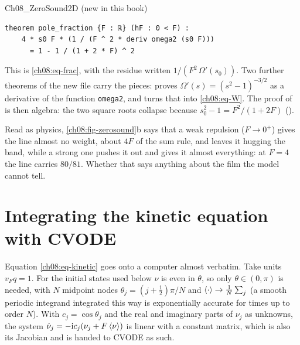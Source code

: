 \begin{leanbox}{Ch08\_ZeroSound2D (new in this book)}
\begin{lstlisting}[style=lean]
theorem pole_fraction {F : ℝ} (hF : 0 < F) :
    4 * s0 F * (1 / (F ^ 2 * deriv omega2 (s0 F)))
      = 1 - 1 / (1 + 2 * F) ^ 2
\end{lstlisting}
\end{leanbox}

This is \eqref{ch08:eq-frac}, with the residue written $1/(F^2\,\Omega'(s_0))$.
Two further theorems of the new file carry the pieces:  proves $\Omega'(s)=(s^2-1)^{-3/2}$ as a derivative of the function \texttt{omega2}, and  turns that into \eqref{ch08:eq-W}.
The proof of  is then algebra: the two square roots collapse because $s_0^2-1=F^2/(1+2F)$ ().

Read as physics, \cref{ch08:fig-zerosound}b says that a weak repulsion ($F\to0^+$) gives the line almost no weight, about $4F$ of the sum rule, and leaves it hugging the band, while a strong one pushes it out and gives it almost everything: at $F=4$ the line carries $80/81$.
Whether that says anything about the film the model cannot tell.

\section{Integrating the kinetic equation with CVODE}\label{ch08:sec-cvode}

Equation \eqref{ch08:eq-kinetic} goes onto a computer almost verbatim.
Take units $v_Fq=1$.
For the initial states used below $\nu$ is even in $\theta$, so only $\theta\in(0,\pi)$ is needed, with $N$ midpoint nodes $\theta_j=(j+\tfrac12)\pi/N$ and $\left\langle \cdot\right\rangle\to\frac1N\sum_j$ (a smooth periodic integrand integrated this way is exponentially accurate for times up to order $N$).
With $c_j=\cos\theta_j$ and the real and imaginary parts of $\nu_j$ as unknowns, the system $\dot\nu_j=-\mathrm{i} c_j(\nu_j+F\left\langle \nu\right\rangle)$ is linear with a constant matrix, which is also its Jacobian and is handed to CVODE as such.

